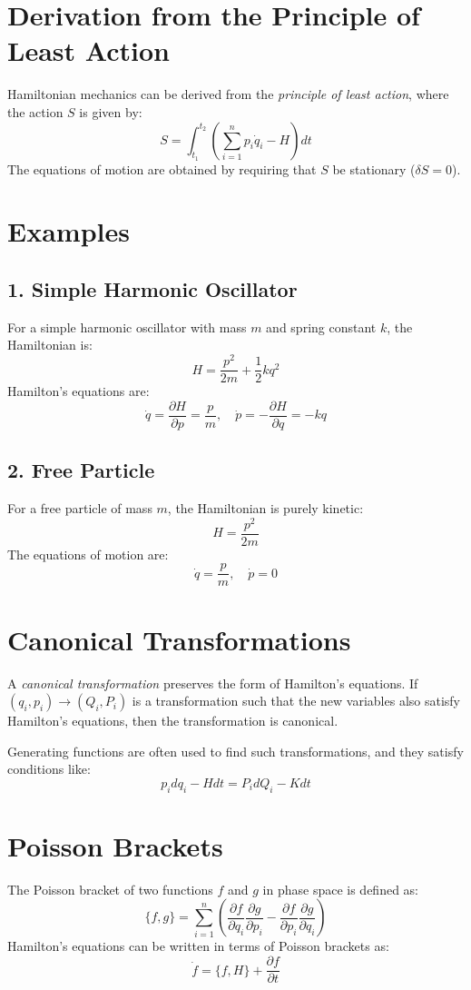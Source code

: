 \section{Derivation from the Principle of Least Action}
Hamiltonian mechanics can be derived from the \textit{principle of least action}, where the action $S$ is given by:
\[
S = \int_{t_1}^{t_2} \left( \sum_{i=1}^{n} p_i \dot{q}_i - H \right) dt
\]
The equations of motion are obtained by requiring that $S$ be stationary ($\delta S = 0$).

\section{Examples}
\subsection*{1. Simple Harmonic Oscillator}
For a simple harmonic oscillator with mass $m$ and spring constant $k$, the Hamiltonian is:
\[
H = \frac{p^2}{2m} + \frac{1}{2} k q^2
\]
Hamilton's equations are:
\[
\dot{q} = \frac{\partial H}{\partial p} = \frac{p}{m}, \quad \dot{p} = -\frac{\partial H}{\partial q} = -kq
\]

\subsection{2. Free Particle}
For a free particle of mass $m$, the Hamiltonian is purely kinetic:
\[
H = \frac{p^2}{2m}
\]
The equations of motion are:
\[
\dot{q} = \frac{p}{m}, \quad \dot{p} = 0
\]

\section{Canonical Transformations}
A \textit{canonical transformation} preserves the form of Hamilton's equations. If $(q_i, p_i) \to (Q_i, P_i)$ is a transformation such that the new variables also satisfy Hamilton's equations, then the transformation is canonical. 

Generating functions are often used to find such transformations, and they satisfy conditions like:
\[
p_i dq_i - H dt = P_i dQ_i - K dt
\]

\section{Poisson Brackets}
The Poisson bracket of two functions $f$ and $g$ in phase space is defined as:
\[
\{f, g\} = \sum_{i=1}^{n} \left( \frac{\partial f}{\partial q_i} \frac{\partial g}{\partial p_i} - \frac{\partial f}{\partial p_i} \frac{\partial g}{\partial q_i} \right)
\]
Hamilton's equations can be written in terms of Poisson brackets as:
\[
\dot{f} = \{f, H\} + \frac{\partial f}{\partial t}
\]

